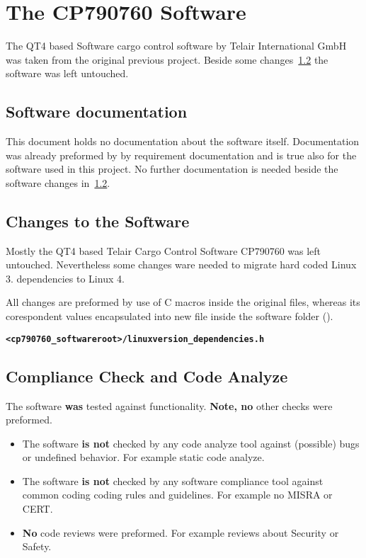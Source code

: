 \chapter{The CP790760 Software}%
\label{cha:software}
The QT4 based Software cargo control software by Telair International GmbH was
taken from the original previous project. Beside some
changes~\ref{sec:software_changes} the software was left untouched.

\section{Software documentation}%
\label{sec:Software_documentation}
This document holds no documentation about the software itself. Documentation
was already preformed by by requirement documentation and is true also for the
software used in this project. No further documentation is needed beside the
software changes in~\ref{sec:software_changes}.


\section{Changes to the Software}%
\label{sec:software_changes}
Mostly the QT4 based Telair Cargo Control Software CP790760 was left untouched.
Nevertheless some changes ware needed to migrate hard coded Linux 3.\@
dependencies to Linux 4.


All changes are preformed by use of C macros inside the original files, whereas
its corespondent values encapsulated into new file inside the software folder
().

\begin{alltt}
    \textbf{<cp790760\_softwareroot>/\textbf{linuxversion\_dependencies.h}}
\end{alltt}

\section{Compliance Check and Code Analyze}%
\label{sec:software_anaylse}

The software \textbf{was} tested against functionality. \textbf{Note, no}
other checks were preformed.

\begin{itemize}
    \item The software \textbf{is not} checked by any code analyze tool against
        (possible) bugs or undefined behavior. For example static code analyze.
    \item The software \textbf{is not} checked by any software compliance tool
        against common coding coding rules and guidelines. For example no MISRA
        or CERT.\@
    \item \textbf{No} code reviews were preformed. For example reviews about
        Security or Safety.
\end{itemize}


